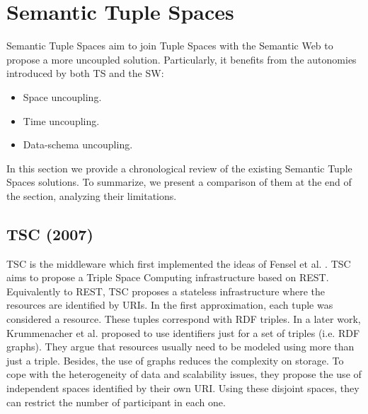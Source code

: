 \section{Semantic Tuple Spaces}
\label{sec:tsc_soa}


Semantic Tuple Spaces aim to join Tuple Spaces with the Semantic Web to propose a more uncoupled solution.
Particularly, it benefits from the autonomies introduced by both TS and the SW:

\begin{itemize}
  \item Space uncoupling.
  \item Time uncoupling.
  \item Data-schema uncoupling. %
\end{itemize}


In this section we provide a chronological review of the existing Semantic Tuple Spaces solutions.
To summarize, we present a comparison of them at the end of the section, analyzing their limitations.


\subsection{TSC (2007)}
TSC \cite{fensel_tsc_2007} is the middleware which first implemented the ideas of Fensel et al. \cite{fensel_triple-space_2004}.
TSC aims to propose a Triple Space Computing infrastructure based on REST.
Equivalently to REST, TSC proposes a stateless infrastructure where the resources are identified by URIs.
In the first approximation, each tuple was considered a resource.
These tuples correspond with RDF triples.
In a later work,  Krummenacher et al. \cite{krummenacher2006specification} proposed to use identifiers just for a set of triples (i.e. RDF graphs).
They argue that resources usually need to be modeled using more than just a triple.
Besides, the use of graphs reduces the complexity on storage.
To cope with the heterogeneity of data and scalability issues, they propose the use of independent spaces identified by their own URI.
Using these disjoint spaces, they can restrict the number of participant in each one.


